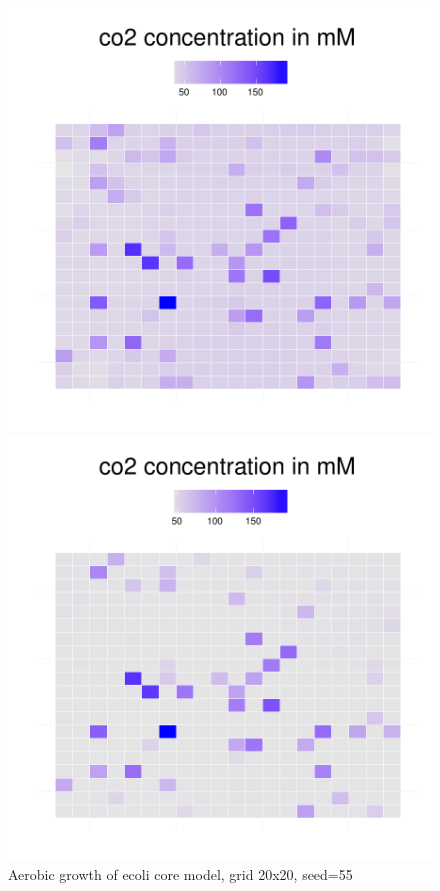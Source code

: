 \begin{figure}[h]
{\begin{minipage}[t]{0.3\textwidth}
  \end{minipage}
  \begin{minipage}[t]{0.3\textwidth}
    \includegraphics[width=\textwidth]{../results/ecoli_20x20_aerob_seed55_co235.pdf}
  \end{minipage}
  \begin{minipage}[t]{0.3\textwidth}
    \includegraphics[width=\textwidth]{../results/ecoli_20x20_aerob_seed55_co250.pdf}
  \end{minipage}
  }
  \caption{Aerobic growth of ecoli core model, grid 20x20, seed=55}
\end{figure}

